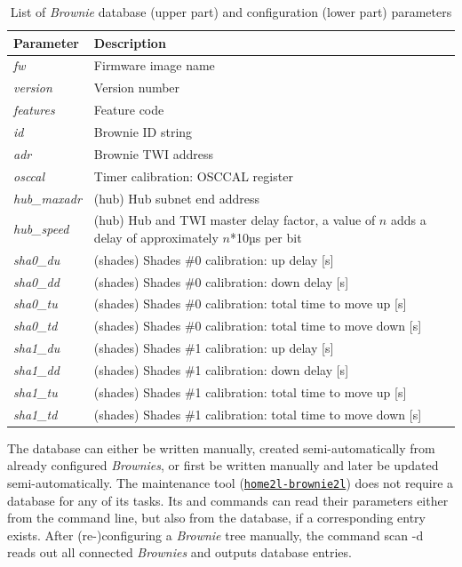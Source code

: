 \documentclass[12pt,english,parskip=half,headheight=19pt]{scrreprt}
\newcommand{\lst}[1]{\colorbox{lstbackground}{\footnotesize\code{#1}}}
\newcommand{\lstf}[1]{\colorbox{lstbackground}{\ttfamily\footnotesize#1}}
\newcommand{\idx}[1]{#1\index{#1}}
\newcommand{\reftool}[1]{\hyperref[tool:#1]{\texttt{\idx{#1}}}}
\begin{document}
\begin{table}[ht]
  \centering
  \renewcommand{\arraystretch}{1.4}
  \begin{tabular}{l|p{12cm}}
    Parameter & Description \\
    \hline \hline
    \textit{fw}         & Firmware image name \\
    \textit{version}    & Version number \\
    \textit{features}   & Feature code \\
    \hline
    \textit{id}         & Brownie ID string \\
    \textit{adr}        & Brownie TWI address \\

    \textit{osccal}     & Timer calibration: OSCCAL register \\

    \textit{hub\_maxadr} & (hub) Hub subnet end address \\
    \textit{hub\_speed} & (hub) Hub and TWI master delay factor, a value of $n$ adds a delay of approximately $n$*10µs per bit \\

    \textit{sha0\_du}   & (shades) Shades \#0 calibration: up delay [s] \\
    \textit{sha0\_dd}   & (shades) Shades \#0 calibration: down delay [s] \\
    \textit{sha0\_tu}   & (shades) Shades \#0 calibration: total time to move up [s] \\
    \textit{sha0\_td}   & (shades) Shades \#0 calibration: total time to move down [s] \\
    \textit{sha1\_du}   & (shades) Shades \#1 calibration: up delay [s] \\
    \textit{sha1\_dd}   & (shades) Shades \#1 calibration: down delay [s] \\
    \textit{sha1\_tu}   & (shades) Shades \#1 calibration: total time to move up [s] \\
    \textit{sha1\_td}   & (shades) Shades \#1 calibration: total time to move down [s] \\
  \end{tabular}
  \caption[l]{List of \textit{Brownie} database (upper part) and configuration (lower part) parameters}
  \label{tab:brownies-config}
\end{table}

The database can either be written manually, created semi-automatically from already configured \textit{Brownies}, or first be written manually and later be updated semi-automatically. The maintenance tool (\reftool{home2l-brownie2l}) does not require a database for any of its tasks. Its \lst{config} and \lst{program} commands can read their parameters either from the command line, but also from the database, if a corresponding entry exists. After (re-)configuring a \textit{Brownie} tree manually, the command \lstf{scan -d} reads out all connected \textit{Brownies} and outputs database entries. 
\end{document}
